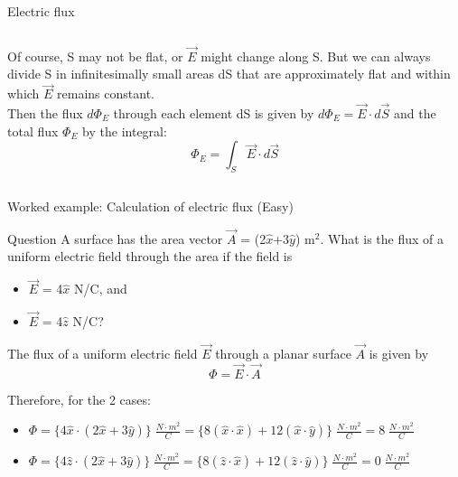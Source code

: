 \begin{frame}{Electric flux}
\begin{columns}
\begin{column}{0.67\textwidth}
{    Of course, S may not be flat, or $\vec{E}$ might change along S.
    But we can always divide S in infinitesimally small areas dS that are approximately
    flat and within which $\vec{E}$ remains constant.\\
    Then the flux $d\Phi_{E}$ through each element dS is given by $d\Phi_{E} = \vec{E} \cdot d\vec{S}$
    and the total flux $\Phi_E$ by the integral:
    \begin{equation*}
       \Phi_{E} = \int_{S} \vec{E} \cdot d\vec{S}
    \end{equation*}
  }
  \end{column}
\end{columns}

\end{frame}

%
%

{
\problemslide

%
%

\begin{frame}{Worked example: Calculation of electric flux (Easy)}

  \begin{blockexmplque}{Question}
    A surface has the area vector $\vec{A}$ = (2$\hat{x}$+3$\hat{y}$) m$^2$.
    What is the flux of a uniform electric field through the area if the field is
    \begin{itemize}
       \item $\vec{E}$ = 4$\hat{x}$ N/C, and
    	 \item $\vec{E}$ = 4$\hat{z}$ N/C?
    \end{itemize}
  \end{blockexmplque}
  \vspace{0.1cm}

  The flux of a uniform electric field $\vec{E}$ through a planar surface
  $\vec{A}$ is given by
  \begin{equation*}
  	\Phi = \vec{E} \cdot \vec{A}
  \end{equation*}

  Therefore, for the 2 cases:
  \begin{itemize}
    \item $\Phi = \Big\{ 4\hat{x} \cdot (2\hat{x} + 3\hat{y}) \Big\} \; \frac{N\cdot m^2}{C}
  	            = \Big\{ 8 (\hat{x} \cdot \hat{x}) + 12 (\hat{x} \cdot \hat{y}) \Big\} \; \frac{N\cdot m^2}{C}
  	            = 8 \; \frac{N\cdot m^2}{C}$
  	\item $\Phi = \Big\{ 4\hat{z} \cdot (2\hat{x} + 3\hat{y}) \Big\} \; \frac{N\cdot m^2}{C}
               	= \Big\{ 8 (\hat{z} \cdot \hat{x}) + 12 (\hat{z} \cdot \hat{y}) \Big\} \; \frac{N\cdot m^2}{C}
  	            = 0 \; \frac{N\cdot m^2}{C}$
  \end{itemize}

\end{frame}


} %

